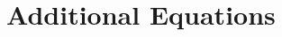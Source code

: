 \documentclass[twocolumn,aps,prd,floatfix,preprintnumbers,a4paper,nofootinbib,
superscriptaddress,10pt]{revtex4-1}
\begin{document}
\newpage

%
\appendix


%
\newpage
\section{Additional Equations}
\label{app:eqns}



%
%
\begin{widetext}
  
\end{widetext}




\newpage
% 


\end{document}
